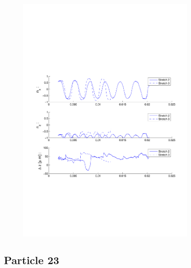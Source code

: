 \begin{figure}[H]

\centering

\includegraphics[width=0.8\textwidth]{Images/Particle 22/Stretch2.pdf}

\end{figure}

\subsection{Particle 23}

